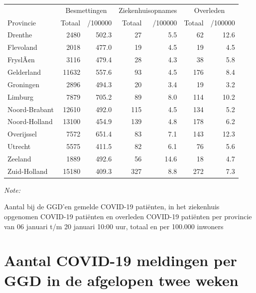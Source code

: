 \documentclass[
  english,
  man,floatsintext]{apa6}
\begin{document}
\begin{table}[H]
\centering
\begin{threeparttable}
\begin{tabular}{lrrrrrr}
\toprule
\multicolumn{1}{c}{ } & \multicolumn{2}{c}{Besmettingen} & \multicolumn{2}{c}{Ziekenhuisopnames} & \multicolumn{2}{c}{Overleden} \\
\cmidrule(l{3pt}r{3pt}){2-3} \cmidrule(l{3pt}r{3pt}){4-5} \cmidrule(l{3pt}r{3pt}){6-7}
Provincie & Totaal & /100000 & Totaal & /100000 & Totaal & /100000\\
\midrule
Drenthe & 2480 & 502.3 & 27 & 5.5 & 62 & 12.6\\
Flevoland & 2018 & 477.0 & 19 & 4.5 & 19 & 4.5\\
FryslÃ¢n & 3116 & 479.4 & 28 & 4.3 & 38 & 5.8\\
Gelderland & 11632 & 557.6 & 93 & 4.5 & 176 & 8.4\\
Groningen & 2896 & 494.3 & 20 & 3.4 & 19 & 3.2\\
Limburg & 7879 & 705.2 & 89 & 8.0 & 114 & 10.2\\
Noord-Brabant & 12610 & 492.0 & 115 & 4.5 & 134 & 5.2\\
Noord-Holland & 13100 & 454.9 & 139 & 4.8 & 178 & 6.2\\
Overijssel & 7572 & 651.4 & 83 & 7.1 & 143 & 12.3\\
Utrecht & 5575 & 411.5 & 82 & 6.1 & 76 & 5.6\\
Zeeland & 1889 & 492.6 & 56 & 14.6 & 18 & 4.7\\
Zuid-Holland & 15180 & 409.3 & 327 & 8.8 & 272 & 7.3\\
\bottomrule
\end{tabular}
\begin{tablenotes}
\item \textit{Note: } 
\item Aantal bij de GGD’en gemelde COVID-19 patiënten, in het ziekenhuis opgenomen COVID-19 patiënten en overleden COVID-19 patiënten per provincie van 06 januari t/m 20 januari 10:00 uur, totaal en per 100.000 inwoners
\end{tablenotes}
\end{threeparttable}
\end{table}

\newpage

\hypertarget{aantal-covid-19-meldingen-per-ggd-in-de-afgelopen-twee-weken}{%
\section{Aantal COVID-19 meldingen per GGD in de afgelopen twee weken}\label{aantal-covid-19-meldingen-per-ggd-in-de-afgelopen-twee-weken}}
\end{document}
